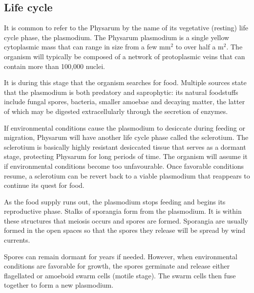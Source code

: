 \subsection{Life cycle}
It is common to refer to the Physarum by the name of its vegetative (resting) life cycle phase, the plasmodium. The Physarum plasmodium is a single yellow cytoplasmic mass that can range in size from a few mm$^2$ to over half a m$^2$. The organism will typically be composed of a network of protoplasmic veins that can contain more than 100,000 nuclei.
\par
It is during this stage that the organism searches for food. Multiple sources state that the plasmodium is both predatory and saprophytic: its natural foodstuffs include fungal spores, bacteria, smaller amoebae and decaying matter, the latter of which may be digested extracellularly through the secretion of enzymes.
\par
If environmental conditions cause the plasmodium to desiccate during feeding or migration, Physarum will have another life cycle phase called the sclerotium. The sclerotium is basically highly resistant desiccated tissue that serves as a dormant stage, protecting Physarum for long periods of time. The organism will assume it if environmental conditions become too
unfavourable. Once favorable conditions resume, a sclerotium can be revert back to a viable plasmodium that reappears to continue its quest for food.
\par
As the food supply runs out, the plasmodium stops feeding and begins its reproductive phase. Stalks of sporangia form from the plasmodium. It is within these structures that meiosis occurs and spores are formed. Sporangia are usually formed in the open spaces so that the spores they release will be spread by wind currents.
\par
Spores can remain dormant for years if needed. However, when environmental conditions are favorable for growth, the spores germinate and release either flagellated or amoeboid swarm cells (motile stage). The swarm cells then fuse together to form a new plasmodium. 

